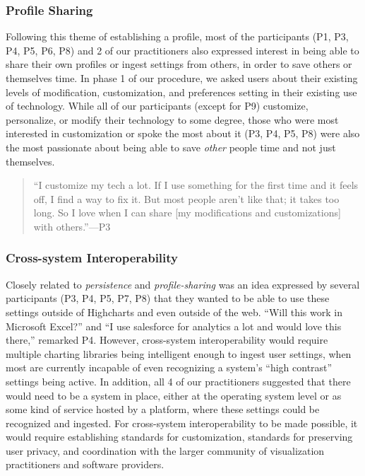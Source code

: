 \documentclass[12pt]{cmuthesis}
\begin{document}
\subsubsection{Profile Sharing}
Following this theme of establishing a profile, most of the participants (P1, P3, P4, P5, P6, P8) and 2 of our practitioners also expressed interest in being able to share their own profiles or ingest settings from others, in order to save others or themselves time. In phase 1 of our procedure, we asked users about their existing levels of modification, customization, and preferences setting in their existing use of technology. While all of our participants (except for P9) customize, personalize, or modify their technology to some degree, those who were most interested in customization or spoke the most about it (P3, P4, P5, P8) were also the most passionate about being able to save \textit{other} people time and not just themselves.

\begin{quote}
``I customize my tech a lot. If I use something for the first time and it feels off, I find a way to fix it. But most people aren't like that; it takes too long. So I love when I can share [my modifications and customizations] with others.''---P3
\end{quote}

\subsubsection{Cross-system Interoperability}
Closely related to \textit{persistence} and \textit{profile-sharing} was an idea expressed by several participants (P3, P4, P5, P7, P8) that they wanted to be able to use these settings outside of Highcharts and even outside of the web. ``Will this work in Microsoft Excel?'' and ``I use salesforce for analytics a lot and would love this there,'' remarked P4. However, cross-system interoperability would require multiple charting libraries being intelligent enough to ingest user settings, when most are currently incapable of even recognizing a system's ``high contrast'' settings being active. In addition, all 4 of our practitioners suggested that there would need to be a system in place, either at the operating system level or as some kind of service hosted by a platform, where these settings could be recognized and ingested. For cross-system interoperability to be made possible, it would require establishing standards for customization, standards for preserving user privacy, and coordination with the larger community of visualization practitioners and software providers.
\end{document}
